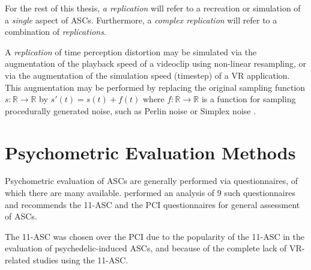 For the rest of this thesis, \textit{a replication} will refer to a recreation or simulation of a \textit{single} aspect of \acp{ASC}. Furthermore, a \textit{complex replication} will refer to a combination of \textit{replications}.

A \textit{replication} of time perception distortion may be simulated via the augmentation of the playback speed of a videoclip using non-linear resampling, or via the augmentation of the simulation speed (timestep) of a \ac{VR} application. This augmentation may be performed by replacing the original sampling function $s \colon \mathbb{R} \to \mathbb{R}$ by $s'(t) = s(t) + f(t)$ where $f \colon \mathbb{R} \to \mathbb{R}$ is a function for sampling procedurally generated noise, such as Perlin noise \autocite{perlin1985image} or Simplex noise \autocite{olano2002simplex}.

\section{Psychometric Evaluation Methods}
Psychometric evaluation of \acp{ASC} are generally performed via questionnaires, of which there are many available.
\textcites{schmidt2018empirische}{figueiredobuilding} performed an analysis of 9 such questionnaires and recommends the \acf{11-ASC} and the \ac{PCI} questionnaires for general assessment of \acp{ASC}.

The \ac{11-ASC} was chosen over the \ac{PCI} due to the popularity of the \ac{11-ASC} in the evaluation of psychedelic-induced \acp{ASC}, and because of the complete lack of \ac{VR}-related studies using the \ac{11-ASC}.

